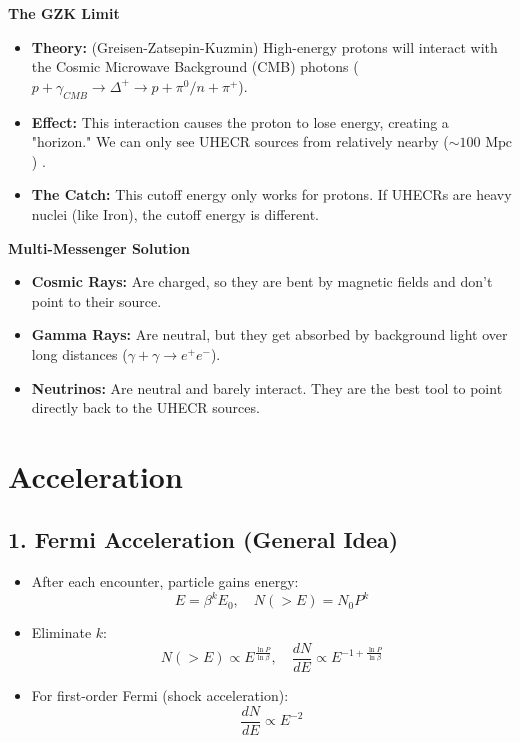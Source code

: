 \documentclass{sciposter}
\begin{document}
\begin{multicols}{3}
 \textbf{The GZK Limit}
    \begin{itemize}
        \item \textbf{Theory:} (Greisen-Zatsepin-Kuzmin) High-energy protons will interact with the Cosmic Microwave Background (CMB) photons ($p + \gamma_{CMB}\rightarrow \Delta^{+}\rightarrow p+\pi^{0} / n+ \pi^{+}   $).
        \item \textbf{Effect:} This interaction causes the proton to lose energy, creating a "horizon." We can only see UHECR sources from relatively nearby ($\sim 100 \text{ Mpc}$) .
        \item \textbf{The Catch:} This cutoff energy only works for protons. If UHECRs are heavy nuclei (like Iron), the cutoff energy is different.
    \end{itemize}

\textbf{Multi-Messenger Solution}
    \begin{itemize}
        \item \textbf{Cosmic Rays:} Are charged, so they are bent by magnetic fields and don't point to their source.
        \item \textbf{Gamma Rays:} Are neutral, but they get absorbed by background light over long distances ($\gamma + \gamma \rightarrow e^+e^-$).
        \item \textbf{Neutrinos:} Are neutral and barely interact. They are the best tool to point directly back to the UHECR sources.
    \end{itemize}




\section{Acceleration}

\subsection*{1. Fermi Acceleration (General Idea)}
\begin{itemize}
    \item After each encounter, particle gains energy:
    \[
        E = \beta^k E_0, \quad N(>E) = N_0 P^k
    \]
    \item Eliminate $k$:
    \[
        N(>E) \propto E^{\frac{\ln P}{\ln \beta}}, \quad 
        \frac{dN}{dE} \propto E^{-1 + \frac{\ln P}{\ln \beta}}
    \]
    \item For first-order Fermi (shock acceleration): 
    \[
        \frac{dN}{dE} \propto E^{-2}
    \]
\end{itemize}


\end{multicols}
\end{document}
